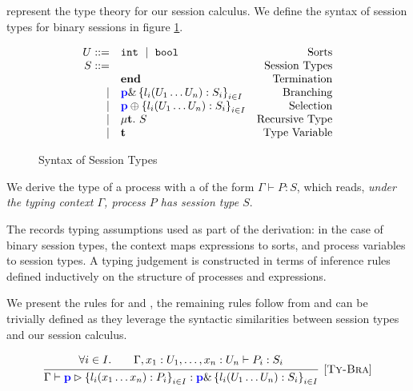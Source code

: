  represent the type theory for our session calculus. We define the syntax of session types for binary sessions in figure \ref{fig:bst}. 

\begin{figure}[!hb]
\doublespacing
\[
\begin{array}{rlr}

U ::= & \text{\tt{int}}~\mid~\text{\tt{bool}} & \text{Sorts} \\

S ::= & & \text{Session Types} \\
     & \mathbf{end} & \text{Termination} \\
\mid & {\color{blue}\mathbf{p}} \& \left\{l_i(U_1 \dots U_n):S_i\right\}_{i\in I} & \text{Branching} \\
\mid & {\color{blue}\mathbf{p}} \oplus \left\{l_i(U_1 \dots U_n):S_i\right\}_{i\in I} & \text{Selection} \\
\mid & \mu \mathbf{t}.~S & \text{Recursive Type} \\
\mid & \mathbf{t} & \text{Type Variable} \\
\end{array}
\]

\singlespacing
\caption{Syntax of Session Types}
\label{fig:bst}
\end{figure}

We derive the type of a process with a  of the form $\Gamma \vdash P: S$, which reads, \textit{under the typing context $\Gamma$, process $P$ has session type $S$}. 

The  records typing assumptions used as part of the derivation: in the case of binary session types, the context maps expressions to sorts, and process variables to session types. A typing judgement is constructed in terms of inference rules defined inductively on the structure of processes and expressions.

We present the rules for  and , the remaining rules follow from \cite{C406Lecture} and can be trivially defined as they leverage the syntactic similarities between session types and our session calculus.

$$
\infer[\mbox{\rulename{Ty-Bra}}]{
	\Gamma \vdash \bra{\parti{p}}{l_i(x_1 \dots x_n):P_i}_{i\in I} : \tybra{\parti{p}}{l_i(U_1 \dots U_n):S_i}_{i\in I}
	}{
	\begin{array}{ccc}
	\forall i \in I.
	&
	&
    \Gamma, x_1: U_1, \dots, x_n: U_n \vdash P_i : S_i		
	\end{array}
}
$$

